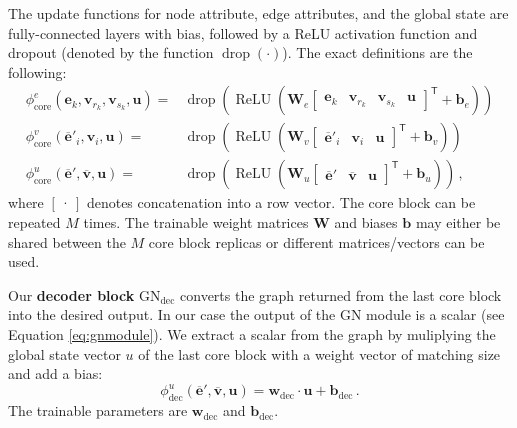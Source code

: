The update functions for node attribute, edge attributes, and the global state are fully-connected layers with bias, followed by a ReLU activation function and dropout (denoted by the function $\operatorname{drop}(\cdot)$). The exact definitions are the following:
\begin{align}
    \phi^e_\text{core}\left(\bm{e}_k,\bm{v}_{r_k},\bm{v}_{s_k},\bm{u}\right)=&
        \operatorname{drop}\left(\operatorname{ReLU}\left(
            \bm{W}_e\begin{bmatrix}\bm{e}_k & \bm{v}_{r_k} & \bm{v}_{s_k} & \bm{u}\end{bmatrix}^\mathsf{T}+\bm{b}_e
        \right)\right)\\
    \phi^v_\text{core}\left(\bm{\overline{e}}'_i,\bm{v}_i,\bm{u}\right)=&
        \operatorname{drop}\left(\operatorname{ReLU}\left(
            \bm{W}_v\begin{bmatrix}\bm{\overline{e}}'_i & \bm{v}_i & \bm{u}\end{bmatrix}^\mathsf{T}+\bm{b}_v
        \right)\right)\\
    \phi^u_\text{core}\left(\bm{\overline{e}}',\bm{\overline{v}},\bm{u}\right)=&
        \operatorname{drop}\left(\operatorname{ReLU}\left(
            \bm{W}_u\begin{bmatrix}\bm{\overline{e}}' & \bm{\overline{v}} & \bm{u}\end{bmatrix}^\mathsf{T}+\bm{b}_u
        \right)\right)\,,
\end{align}where $\begin{bmatrix}\cdot\end{bmatrix}$ denotes concatenation into a row vector. The core block can be repeated $M$ times. The trainable weight matrices $\bm{W}$ and biases $\bm{b}$ may either be shared between the $M$ core block replicas or different matrices/vectors can be used.

Our \textbf{decoder block} $\text{GN}_\text{dec}$ converts the graph returned from the last core block into the desired output. In our case the output of the GN module is a scalar (see Equation \ref{eq:gnmodule}). We extract a scalar from the graph by muliplying the global state vector $u$ of the last core block with a weight vector of matching size and add a bias:
\begin{equation}
    \label{eq:dec:nodeupdate}
    \phi^u_\text{dec}\left(\bm{\overline{e}}',\bm{\overline{v}},\bm{u}\right)=\bm{w}_\text{dec}\cdot\bm{u}+\bm{b}_\text{dec}\,.
\end{equation}
The trainable parameters are $\bm{w}_\text{dec}$ and $\bm{b}_\text{dec}$.

